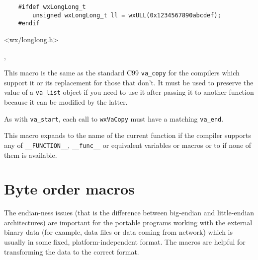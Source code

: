 \begin{verbatim}
    #ifdef wxLongLong_t
        unsigned wxLongLong_t ll = wxULL(0x1234567890abcdef);
    #endif
\end{verbatim}


<wx/longlong.h>


, 


\label{wxvacopy}


This macro is the same as the standard C99 \texttt{va\_copy} for the compilers
which support it or its replacement for those that don't. It must be used to
preserve the value of a \texttt{va\_list} object if you need to use it after
passing it to another function because it can be modified by the latter.

As with \texttt{va\_start}, each call to \texttt{wxVaCopy} must have a matching
\texttt{va\_end}.



\label{wxfunction}


This macro expands to the name of the current function if the compiler supports
any of \texttt{\_\_FUNCTION\_\_}, \texttt{\_\_func\_\_} or equivalent variables
or macros or to \NULL if none of them is available.



\section{Byte order macros}\label{byteordermacros}

The endian-ness issues (that is the difference between big-endian and
little-endian architectures) are important for the portable programs working
with the external binary data (for example, data files or data coming from
network) which is usually in some fixed, platform-independent format. The
macros are helpful for transforming the data to the correct format.


\label{intswapalways}



